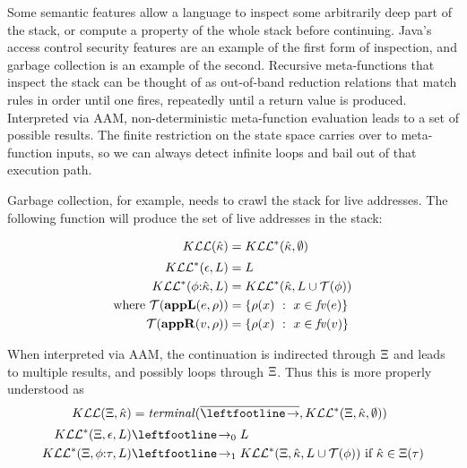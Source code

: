 Some semantic features allow a language to inspect some arbitrarily deep part of the stack, or compute a property of the whole stack before continuing.
%
Java's access control security features are an example of the first form of inspection, and garbage collection is an example of the second.
%
Recursive meta-functions that inspect the stack can be thought of as out-of-band reduction relations that match rules in order until one fires, repeatedly until a return value is produced.
%
Interpreted via AAM, non-deterministic meta-function evaluation leads to a set of possible results.
%
The finite restriction on the state space carries over to meta-function inputs, so we can always detect infinite loops and bail out of that execution path.

Garbage collection, for example, needs to crawl the stack for live addresses.
The following function will produce the set of live addresses in the stack:

\begin{align*}
  K{\mathcal L}{\mathcal L}(\hat{\kappa}) &= K{\mathcal L}{\mathcal L}^*(\hat{\kappa},\emptyset) \\[2pt]
  K{\mathcal L}{\mathcal L}^*(\epsilon,L) &= L \\
  K{\mathcal L}{\mathcal L}^*(\phi{\tt :} \hat{\kappa}, L) &= K{\mathcal L}{\mathcal L}^*(\hat{\kappa}, L\cup{\mathcal T}(\phi)) \\
  \text{where } {\mathcal T}(\mathbf{appL}(e,\rho)) &= \{ \rho(x)\ :\ x \in \mathit{fv}(e)\} \\
                {\mathcal T}(\mathbf{appR}(v,\rho)) &= \{ \rho(x)\ :\ x \in \mathit{fv}(v)\}
\end{align*}

When interpreted via AAM, the continuation is indirected through $\Xi$ and leads to multiple results, and possibly loops through $\Xi$.
%
Thus this is more properly understood as
\begin{align*}
  \kontlive(\mktab,\makont) &= \terminal(\overline{\stepto},\kontliveaux(\mktab,\makont,\emptyset)) \\[2pt]
  \kontliveaux(\mktab,\epsilon,L) &\stepto_0 L \\
  \kontliveaux(\mktab,\kcons{\mkframe}{\mctx}, L) &\stepto_1 \kontliveaux(\mktab,\makont, L\cup\touches(\mkframe)) \text{ if } \makont \in \mktab(\mctx)
\end{align*}


